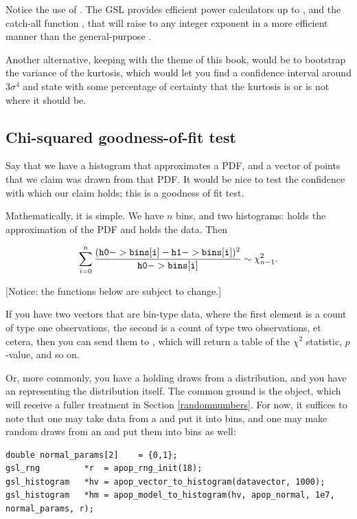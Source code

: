 Notice the use of . The GSL provides efficient
power calculators up to , and the catch-all function
, that will raise
 to any integer exponent in a more efficient manner than the
general-purpose .

Another alternative, keeping with the theme of this book, would be
to bootstrap the variance of the kurtosis, which would let you find a
confidence interval around $3 \sigma^4$ and state with some percentage
of certainty that the kurtosis is or is not where it should
be.\label{bootkurt}


\subsection{Chi-squared goodness-of-fit test} 
Say that we have a histogram that approximates a PDF, and a vector of
points that we claim was drawn from that PDF. It would be nice to test
the confidence with which our claim holds; this is a goodness
of fit test.

Mathematically, it is simple. We have $n$ bins, and two histograms:
holds the approximation of the PDF and  holds the data. Then 

\begin{equation}    \label{gofstat}
\sum_{i=0}^n {\frac{({\tt h0->bins[i]} - {\tt h1->bins[i]})^2}{{\tt h0->bins[i]}}} \sim \chi^2_{n-1}.
\end{equation}

[Notice: the functions below are subject to change.]

If you have two vectors that are bin-type data, where the first element
is a count of type one observations, the second is a count of type two
observations, et cetera, then you can send them to
, which will return a table
of the $\chi^2$ statistic, $p$-value, and so on.

Or, more commonly, you have a  holding
draws from a distribution, and you have an 
representing the distribution itself. The common ground is the
 object, which will receive a fuller treatment in
Section \ref{randomnumbers}. For now, it suffices to note that one may
take data from a  and put it into bins, and one may make
random draws from an  and put them into bins as well: 
\begin{lstlisting}
double normal_params[2]    = {0,1};
gsl_rng         *r  = apop_rng_init(18);
gsl_histogram   *hv = apop_vector_to_histogram(datavector, 1000);
gsl_histogram   *hm = apop_model_to_histogram(hv, apop_normal, 1e7, normal_params, r);
\end{lstlisting}


